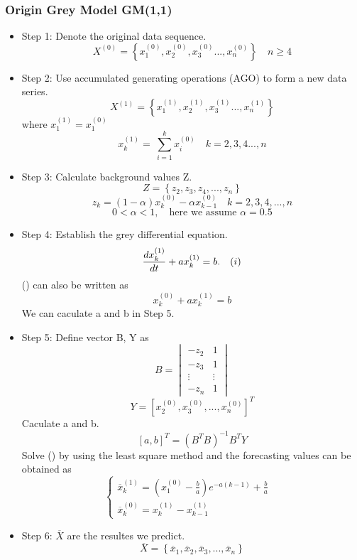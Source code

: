 \documentclass{mcmthesis}
\begin{document}
\subsubsection{Origin Grey Model GM(1,1)}
	\begin{itemize}
		\item Step 1: Denote the original data sequence.
		$$
			X^{(0)} = \left\{x^{(0)}_1, x^{(0)}_2, x^{(0)}_3..., x^{(0)}_n\right\} \quad n \ge 4
		$$
		\item Step 2: Use accumulated generating operations (AGO) to form a new data series.
		$$
			X^{(1)} = \left\{x^{(1)}_1, x^{(1)}_2, x^{(1)}_3..., x^{(1)}_n\right\} 
		$$
		where $x^{(1)}_1=x^{(0)}_1$
		$$
			x^{(1)}_k = \ \sum_{i=1}^k x^{(0)}_i \quad k=2,3,4...,n
		$$
		\item Step 3: Calculate background values Z.
		$$
			Z = \left\{z_2,z_3,z_4,...,z_n\right\}
		$$
		$$
			z_k = (1-\alpha)x^{(0)}_{k} - \alpha x^{(0)}_{k-1} \quad k=2,3,4,...,n 
		$$
		$$
		 0<\alpha <1,\quad \mbox{here\ we\ assume\ } \alpha = 0.5
		$$
		\item Step 4: Establish the grey differential equation.
		$$
			\frac {dx^{(1)}_k}{dt} +  ax^{(1)}_k = b.\quad (\uppercase\expandafter{\romannumeral1})
		$$
		 (\uppercase\expandafter{}) can also be written as 
		 $$
		 	x^{(0)}_k + ax^{(1)}_k = b
		 $$
		 We can caculate a and b in Step 5.
		\item Step 5:
		Define vector B, Y as
		$$
			B = 
			\begin{vmatrix}
			-z_2 & 1\\
			-z_3 & 1\\
			\vdots & \vdots\\
			-z_n & 1
			\end{vmatrix}
		$$
		$$
		Y = [x^{(0)}_2,x^{(0)}_3,...,x^{(0)}_n]^T
		$$
		Caculate a and b.
		$$
			[a,b]^T = (B^TB)^{-1}B^TY
		$$
		 Solve (\uppercase\expandafter{}) by using the least square method and the forecasting values can be obtained as
		$$
			\left\{  
             \begin{array}{lr}  
             \overline x^{(1)}_k = \left(x^{(0)}_1 - \frac{b}{a}\right)e^{-a(k-1)} + \frac{b}{a} &\\
             \overline x^{(0)}_k = x^{(1)}_k - x^{(1)}_{k-1}
             \end{array}  
			\right.  
		$$
		\item Step 6: $\overline X$ are the resultes we predict.
		$$
		\overline X = \left\{\overline x_1,\overline x_2,\overline x_3,...,\overline x_n \right\}
		$$
		
	\end{itemize}
\end{document}
